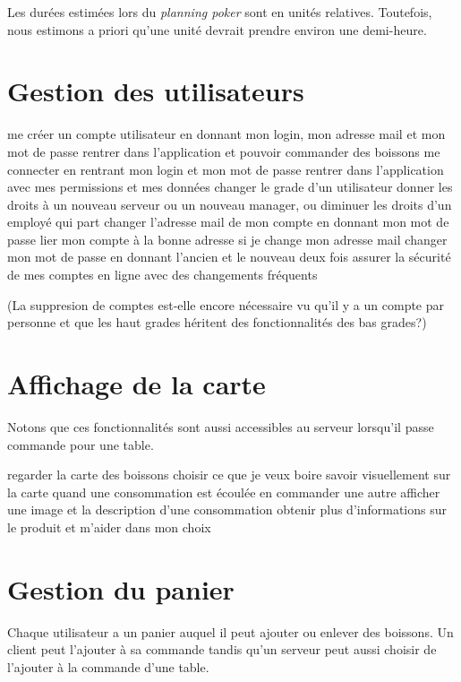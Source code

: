 \documentclass[a4paper,10pt]{article}
\begin{document}

Les durées estimées lors du \emph{planning poker} sont en unités relatives.
Toutefois, nous estimons a priori qu'une unité devrait prendre environ une demi-heure.

\section{Gestion des utilisateurs}

{me créer un compte utilisateur en donnant mon login, mon adresse mail et mon mot de passe}
{rentrer dans l'application et pouvoir commander des boissons}
{me connecter en rentrant mon login et mon mot de passe}
{rentrer dans l'application avec mes permissions et mes données}
{changer le grade d'un utilisateur}
{donner les droits à un nouveau serveur ou un nouveau manager, ou diminuer les droits d'un employé qui part}
{changer l'adresse mail de mon compte en donnant mon mot de passe}
{lier mon compte à la bonne adresse si je change mon adresse mail}
{changer mon mot de passe en donnant l'ancien et le nouveau deux fois}
{assurer la sécurité de mes comptes en ligne avec des changements fréquents}

(La suppresion de comptes est-elle encore nécessaire vu qu'il y a un compte par personne et que les haut grades héritent des fonctionnalités des bas grades?)

\section{Affichage de la carte}

Notons que ces fonctionnalités sont aussi accessibles au serveur lorsqu'il passe commande pour une table.

{regarder la carte des boissons}
{choisir ce que je veux boire}
{savoir visuellement sur la carte quand une consommation est écoulée}
{en commander une autre}
{afficher une image et la description d'une consommation}
{obtenir plus d'informations sur le produit et m'aider dans mon choix}

\section{Gestion du panier}

Chaque utilisateur a un panier auquel il peut ajouter ou enlever des boissons.
Un client peut l'ajouter à sa commande tandis qu'un serveur peut aussi choisir de l'ajouter à la commande d'une table.
\end{document}
